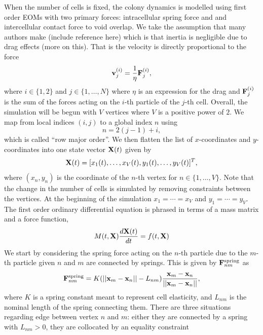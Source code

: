 When the number of cells is fixed, the colony dynamics is modelled
using first order EOMs with two primary forces: intracellular spring force and
and intercellular contact force to void overlap. We take the assumption that 
many authors make (include reference here) which is that inertia is negligible
due to drag effects (more on this). That is the velocity is directly
proportional to the force
\begin{equation*}
\vb{v}_j^{(i)} = \frac{1}{\eta} \vb{F}_j^{(i)},
\end{equation*}
where $i \in \{1,2\}$ and $j \in \{1, \ldots, N\}$ where $\eta$ is an expression for
the drag and $\vb{F}_j^{(i)}$ is the sum of the forces acting on the $i$-th particle of
the $j$-th cell. Overall, the simulation will be begun with $V$ vertices where $V$ is a
positive power of $2$. We map from local indices $(i,j)$ to a global index $n$ using
\begin{equation*}
    n = 2(j-1) +i,
\end{equation*}
which is called ``row major order''. We then flatten the list of $x$-coordinates and 
$y$-coordinates into one state vector $\vb{X}(t)$ given by
\begin{equation*}
    \vb{X}(t) = [x_1(t), \ldots, x_V(t), y_1(t), \ldots, y_V(t)]^T,
\end{equation*}
where $(x_n,y_n)$ is the coordinate of the $n$-th vertex for $n \in \{1,\ldots,V\}$.
Note that the change in the number of cells is simulated by removing constraints
between the vertices. At the beginning of the simulation $x_1 = \cdots = x_V$ and
$y_1 = \cdots = y_V$. The first order ordinary differential equation is phrased
in terms of a mass matrix and a force function,
\begin{equation*}
    M(t,\vb{X})\frac{d \vb{X} (t)}{dt} = f(t,\vb{X})
\end{equation*}
We start by considering the spring force acting on the $n$-th particle due to the $m$-th 
particle given $n$ and $m$ are connected by springs. This is given by $\vb{F}_{nm}^{\textrm{spring}}$ as
\begin{equation*}
    \vb{F}_{nm}^{\textrm{spring}} = 
    K(|| \vb{x}_m - \vb{x}_n|| - L_{nm}) \frac{\vb{x}_m - \vb{x}_n}{|| \vb{x}_m - \vb{x}_n||},
\end{equation*}
where $K$ is a spring constant meant to represent cell elasticity, and $L_{nm}$ is the nominal length
of the spring connecting them. There are three situations regarding edge between vertex $n$ and $m$:
either they are connected by a spring with $L_{nm}>0$, they are collocated by an equality constraint
